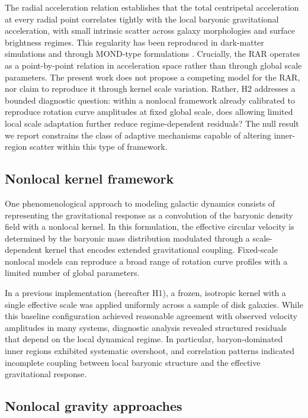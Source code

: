 \documentclass[twocolumn,linenumbers]{aastex701}
\begin{document}
The radial acceleration relation \citep[RAR;][]{mcgaugh2016, lelli2017}
establishes that the total centripetal acceleration at every radial point
correlates tightly with the local baryonic gravitational acceleration, with
small intrinsic scatter across galaxy morphologies and surface brightness
regimes. This regularity has been reproduced in dark-matter simulations
\citep{ludlow2017} and through MOND-type formulations \citep{milgrom1983,
famaey2012}. Crucially, the RAR operates as a point-by-point relation in
acceleration space rather than through global scale parameters. The present
work does not propose a competing model for the RAR, nor claim to reproduce
it through kernel scale variation. Rather, H2 addresses a bounded diagnostic
question: within a nonlocal framework already calibrated to reproduce rotation
curve amplitudes at fixed global scale, does allowing limited local scale
adaptation further reduce regime-dependent residuals? The null result we
report constrains the class of adaptive mechanisms capable of altering
inner-region scatter within this type of framework.

\subsection{Nonlocal kernel framework}

One phenomenological approach to modeling galactic dynamics consists of
representing the gravitational response as a convolution of the baryonic
density field with a nonlocal kernel. In this formulation, the effective
circular velocity is determined by the baryonic mass distribution modulated
through a scale-dependent kernel that encodes extended gravitational coupling.
Fixed-scale nonlocal models can reproduce a broad range of rotation curve
profiles with a limited number of global parameters.

In a previous implementation (hereafter H1), a frozen, isotropic kernel with
a single effective scale was applied uniformly across a sample of disk
galaxies. While this baseline configuration achieved reasonable agreement
with observed velocity amplitudes in many systems, diagnostic analysis
revealed structured residuals that depend on the local dynamical regime.
In particular, baryon-dominated inner regions exhibited systematic overshoot,
and correlation patterns indicated incomplete coupling between local baryonic
structure and the effective gravitational response.

\subsection{Nonlocal gravity approaches}
\end{document}
